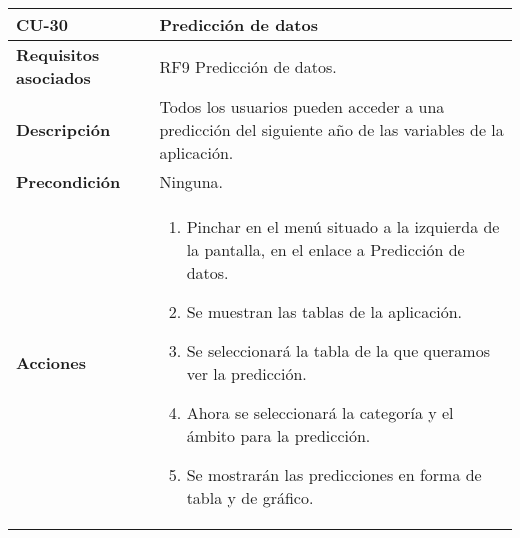 \newpage
\begin{longtable}[t]{@{}ll@{}}
\toprule
\begin{minipage}[t]{0.23\columnwidth}\raggedright\strut
\textbf{CU-30}\strut
\end{minipage} & \begin{minipage}[b]{0.71\columnwidth}\raggedright\strut
\textbf{Predicción de datos}\strut
\end{minipage}\tabularnewline
\midrule
\endhead
\begin{minipage}[t]{0.23\columnwidth}\raggedright\strut
\textbf{Requisitos asociados}\strut
\end{minipage} & \begin{minipage}[t]{0.71\columnwidth}\raggedright\strut
RF9 Predicción de datos. \strut
\end{minipage}\tabularnewline
\begin{minipage}[t]{0.23\columnwidth}\raggedright\strut
\textbf{Descripción}\strut
\end{minipage} & \begin{minipage}[t]{0.71\columnwidth}\raggedright\strut
Todos los usuarios pueden acceder a una predicción del siguiente año de las variables de la aplicación.
\strut
\end{minipage}\tabularnewline
\begin{minipage}[t]{0.23\columnwidth}\raggedright\strut
\textbf{Precondición}\strut
\end{minipage} & \begin{minipage}[t]{0.71\columnwidth}\raggedright\strut
Ninguna.\strut
\end{minipage}\tabularnewline
\begin{minipage}[t]{0.23\columnwidth}\raggedright\strut
\textbf{Acciones}\strut
\end{minipage} & \begin{minipage}[t]{0.71\columnwidth}\raggedright\strut
\begin{enumerate}
\def\labelenumi{\arabic{enumi}.}
\tightlist
\item
Pinchar en el menú situado a la izquierda de la pantalla, en el
enlace a Predicción de datos.
\item
Se muestran las tablas de la aplicación.
\item
Se seleccionará la tabla de la que queramos ver la predicción.
\item
Ahora se seleccionará la categoría y el ámbito para la predicción.
\item
Se mostrarán las predicciones en forma de tabla y de gráfico.

\end{enumerate}
\end{minipage}
\end{longtable}
